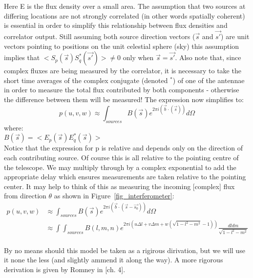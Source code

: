 Here E is the flux density over a small area. The assumption that two sources at differing locations are not strongly correlated (in other words spatially coherent) is
essential in order to simplify this relationship between flux densities and correlator output. Still assuming both source 
direction vectors ($\vec{s}$ and $\vec{s'}$) are unit vectors pointing to positions on the unit celestial sphere (sky) this
assumption implies that $<S_p(\vec{s})S_q^*(\vec{s'})> \neq 0$ only when $\vec{s} = \vec{s'}$. Also note that, since complex fluxes
are being measured by the correlator, it is necessary to take the short time averages of the complex conjugate (denoted $^{*}$)
of one of the antennae in order to measure the total flux contributed by both components - otherwise the difference between
them will be measured! The expression now simplifies to:
\begin{equation*}
 p(u,v,w) \approx \int_{sources}{B(\vec{s})e^{2\pi i(\vec{b}\cdot(\vec{s}))}d\Omega}
\end{equation*}
where:\\
$B(\vec{s}) = <E_p(\vec{s})E_q^*(\vec{s})>$\\

Notice that the expression for p is relative and depends only on the direction of each contributing source. Of course this
is all relative to the pointing centre of the telescope. We may multiply through by a complex exponential to add the appropriate 
delay which ensures measurements are taken relative to the pointing center. It may help to think of this as measuring the
incoming [complex] flux from direction $\theta$ as shown in Figure~\ref{fig_interferometer}:
\begin{equation}
 \label{EQN_ONE_CORR_RIME}
 \begin{split}
 p(u,v,w) &\approx \int_{sources}{B(\vec{s})e^{2\pi i(\vec{b}\cdot(\vec{s}-\vec{s_0}))}d\Omega}\\
	  &\approx \int\int_{sources}{B(l,m,n)e^{2\pi i(u\Delta l+v\Delta m+w(\sqrt{1-l^2-m^2}-1))}\frac{dldm}{\sqrt{1-l^2-m^2}}}\\
 \end{split}
\end{equation}

By no means should this model be taken as a rigirous dirivation, but we will use it none the less (and slightly ammend it 
along the way). A more rigorous derivation is given by Romney in \cite{taylor1999synthesis}[ch. 4].

